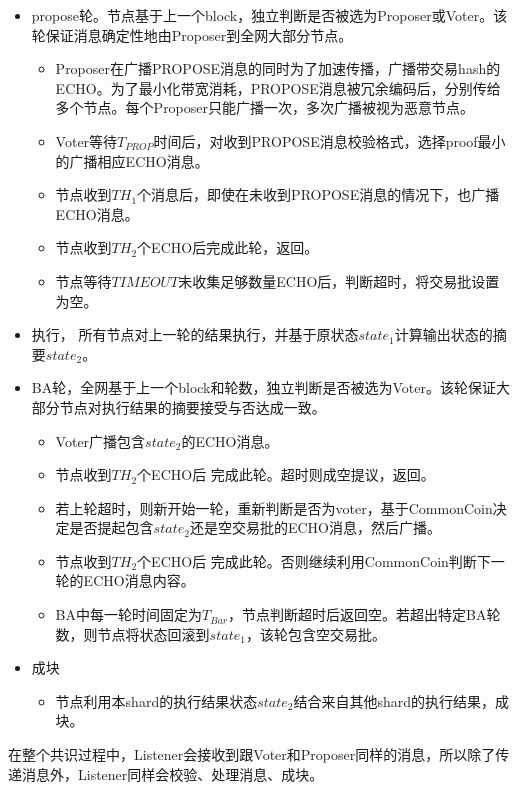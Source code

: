 \documentclass[12pt, UTF8]{article}
\begin{document}
\begin{itemize}
\item propose轮。节点基于上一个block，独立判断是否被选为Proposer或Voter。该轮保证消息确定性地由Proposer到全网大部分节点。
\begin{itemize}
\item Proposer在广播PROPOSE消息的同时为了加速传播，广播带交易hash的ECHO。为了最小化带宽消耗，PROPOSE消息被冗余编码后，分别传给多个节点。每个Proposer只能广播一次，多次广播被视为恶意节点。
\item Voter等待$T_{PROP}$时间后，对收到PROPOSE消息校验格式，选择proof最小的广播相应ECHO消息。
\item 节点收到$TH_1$个消息后，即使在未收到PROPOSE消息的情况下，也广播ECHO消息。
\item 节点收到$TH_2$个ECHO后完成此轮，返回。
\item 节点等待$TIMEOUT$未收集足够数量ECHO后，判断超时，将交易批设置为空。
\end{itemize}

\item 执行， 所有节点对上一轮的结果执行，并基于原状态$state_1$计算输出状态的摘要$state_2$。

\item BA轮，全网基于上一个block和轮数，独立判断是否被选为Voter。该轮保证大部分节点对执行结果的摘要接受与否达成一致。
\begin{itemize}
\item Voter广播包含$state_2$的ECHO消息。
\item 节点收到$TH_2$个ECHO后 完成此轮。超时则成空提议，返回。
\item 若上轮超时，则新开始一轮，重新判断是否为voter，基于CommonCoin决定是否提起包含$state_2$还是空交易批的ECHO消息，然后广播。
\item 节点收到$TH_2$个ECHO后 完成此轮。否则继续利用CommonCoin判断下一轮的ECHO消息内容。
\item BA中每一轮时间固定为$T_{Bar}$，节点判断超时后返回空。若超出特定BA轮数，则节点将状态回滚到$state_1$，该轮包含空交易批。
\end{itemize}

\item 成块
\begin{itemize}
\item 节点利用本shard的执行结果状态$state_2$结合来自其他shard的执行结果，成块。
\end{itemize}

\end{itemize}
在整个共识过程中，Listener会接收到跟Voter和Proposer同样的消息，所以除了传递消息外，Listener同样会校验、处理消息、成块。
\end{document}
